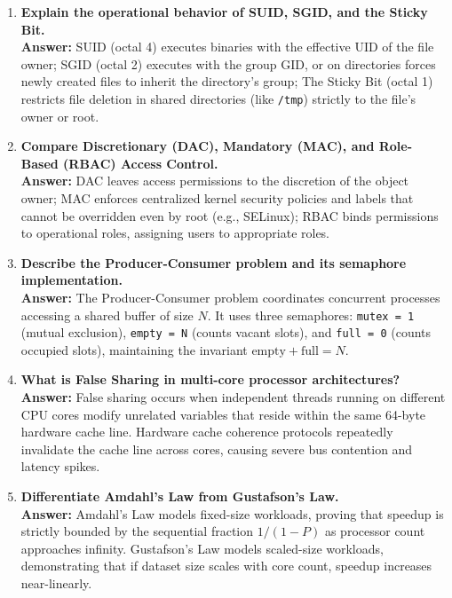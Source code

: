 \begin{enumerate}[label=\textbf{Q\arabic*.},leftmargin=1.2cm]
\item \textbf{Explain the operational behavior of SUID, SGID, and the Sticky Bit.} \\
\textbf{Answer:} SUID (octal 4) executes binaries with the effective UID of the file owner; SGID (octal 2) executes with the group GID, or on directories forces newly created files to inherit the directory's group; The Sticky Bit (octal 1) restricts file deletion in shared directories (like \texttt{/tmp}) strictly to the file's owner or root.

\item \textbf{Compare Discretionary (DAC), Mandatory (MAC), and Role-Based (RBAC) Access Control.} \\
\textbf{Answer:} DAC leaves access permissions to the discretion of the object owner; MAC enforces centralized kernel security policies and labels that cannot be overridden even by root (e.g., SELinux); RBAC binds permissions to operational roles, assigning users to appropriate roles.

\item \textbf{Describe the Producer-Consumer problem and its semaphore implementation.} \\
\textbf{Answer:} The Producer-Consumer problem coordinates concurrent processes accessing a shared buffer of size $N$. It uses three semaphores: \texttt{mutex = 1} (mutual exclusion), \texttt{empty = N} (counts vacant slots), and \texttt{full = 0} (counts occupied slots), maintaining the invariant $\text{empty} + \text{full} = N$.

\item \textbf{What is False Sharing in multi-core processor architectures?} \\
\textbf{Answer:} False sharing occurs when independent threads running on different CPU cores modify unrelated variables that reside within the same 64-byte hardware cache line. Hardware cache coherence protocols repeatedly invalidate the cache line across cores, causing severe bus contention and latency spikes.

\item \textbf{Differentiate Amdahl's Law from Gustafson's Law.} \\
\textbf{Answer:} Amdahl's Law models fixed-size workloads, proving that speedup is strictly bounded by the sequential fraction $1/(1-P)$ as processor count approaches infinity. Gustafson's Law models scaled-size workloads, demonstrating that if dataset size scales with core count, speedup increases near-linearly.


\end{enumerate}
